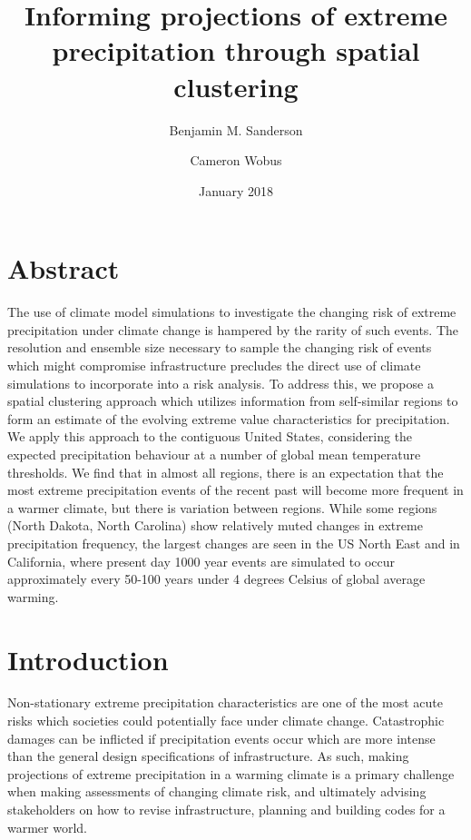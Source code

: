\documentclass{article}
\title{Informing projections of extreme precipitation through spatial clustering}
\author{Benjamin M. Sanderson}
\affil{National Center for Atmospheric Research,\\ Boulder CO, USA}
\author{Cameron Wobus}
\affil{Abt Associates, Boulder CO, USA}
\date{January 2018}
\begin{document}
\maketitle
\section{Abstract}
The use of climate model simulations to investigate the changing risk of extreme precipitation under climate change is hampered by the rarity of such events.  The resolution and ensemble size necessary to sample the changing risk of events which might compromise infrastructure precludes the direct use of climate simulations to incorporate into a risk analysis.  To address this, we propose a spatial clustering approach which utilizes information from self-similar regions to form an estimate of the evolving extreme value characteristics for precipitation.  We apply this approach to the contiguous United States, considering the expected precipitation behaviour at a number of global mean temperature thresholds.  We find that in almost all regions, there is an expectation that the most extreme precipitation events of the recent past will become more frequent in a warmer climate, but there is variation between regions.  While some regions (North Dakota, North Carolina) show relatively muted changes in extreme precipitation frequency, the largest changes are seen in the US North East and in California, where present day 1000 year events are simulated to occur approximately every 50-100 years under 4 degrees Celsius of global average warming.

\section{Introduction}
Non-stationary extreme precipitation characteristics are one of the most acute risks which societies could potentially face under climate change.  Catastrophic damages can be inflicted if precipitation events occur which are more intense than the general design specifications of infrastructure.  As such, making projections of extreme precipitation in a warming climate is a primary challenge when making assessments of changing climate risk, and ultimately advising stakeholders on how to revise infrastructure, planning and building codes for a warmer world.
\end{document}
